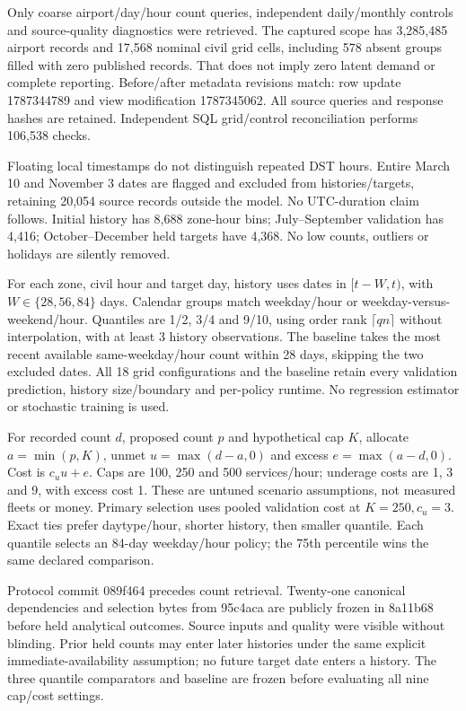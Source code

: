 \documentclass[11pt]{article}
\begin{document}
Only coarse airport/day/hour count queries, independent daily/monthly controls and source-quality diagnostics were retrieved. The captured scope has 3,285,485 airport records and 17,568 nominal civil grid cells, including 578 absent groups filled with zero published records. That does not imply zero latent demand or complete reporting. Before/after metadata revisions match: row update 1787344789 and view modification 1787345062. All source queries and response hashes are retained. Independent SQL grid/control reconciliation performs 106,538 checks.

Floating local timestamps do not distinguish repeated DST hours. Entire March 10 and November 3 dates are flagged and excluded from histories/targets, retaining 20,054 source records outside the model. No UTC-duration claim follows. Initial history has 8,688 zone-hour bins; July--September validation has 4,416; October--December held targets have 4,368. No low counts, outliers or holidays are silently removed.

For each zone, civil hour and target day, history uses dates in $[t-W,t)$, with $W\in\{28,56,84\}$ days. Calendar groups match weekday/hour or weekday-versus-weekend/hour. Quantiles are 1/2, 3/4 and 9/10, using order rank $\lceil qn\rceil$ without interpolation, with at least 3 history observations. The baseline takes the most recent available same-weekday/hour count within 28 days, skipping the two excluded dates. All 18 grid configurations and the baseline retain every validation prediction, history size/boundary and per-policy runtime. No regression estimator or stochastic training is used.

For recorded count $d$, proposed count $p$ and hypothetical cap $K$, allocate $a=\min(p,K)$, unmet $u=\max(d-a,0)$ and excess $e=\max(a-d,0)$. Cost is $c_u u+e$. Caps are 100, 250 and 500 services/hour; underage costs are 1, 3 and 9, with excess cost 1. These are untuned scenario assumptions, not measured fleets or money. Primary selection uses pooled validation cost at $K=250,c_u=3$. Exact ties prefer daytype/hour, shorter history, then smaller quantile. Each quantile selects an 84-day weekday/hour policy; the 75th percentile wins the same declared comparison.

Protocol commit 089f464 precedes count retrieval. Twenty-one canonical dependencies and selection bytes from 95c4aca are publicly frozen in 8a11b68 before held analytical outcomes. Source inputs and quality were visible without blinding. Prior held counts may enter later histories under the same explicit immediate-availability assumption; no future target date enters a history. The three quantile comparators and baseline are frozen before evaluating all nine cap/cost settings.
\newpage
\end{document}
